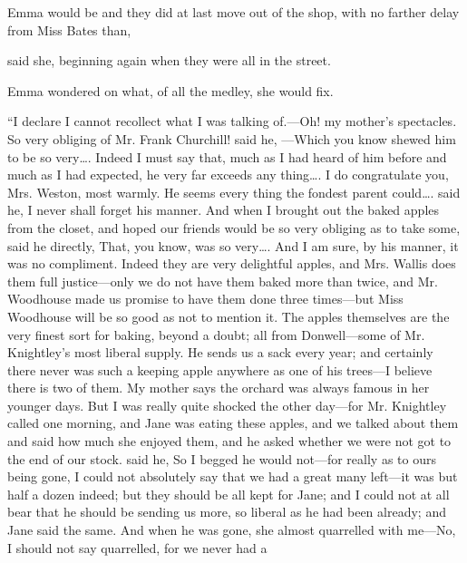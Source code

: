 Emma would be  and they did at last move out of the shop, with no farther delay from Miss Bates than,


 said she, beginning again when they were all in the street.

Emma wondered on what, of all the medley, she would fix.

“I declare I cannot recollect what I was talking of.---Oh! my mother's spectacles. So very obliging of Mr. Frank Churchill!  said he, ---Which you know shewed him to be so very\ldots{}. Indeed I must say that, much as I had heard of him before and much as I had expected, he very far exceeds any thing\ldots{}. I do congratulate you, Mrs. Weston, most warmly. He seems every thing the fondest parent could\ldots{}.  said he,  I never shall forget his manner. And when I brought out the baked apples from the closet, and hoped our friends would be so very obliging as to take some,  said he directly,  That, you know, was so very\ldots{}. And I am sure, by his manner, it was no compliment. Indeed they are very delightful apples, and Mrs. Wallis does them full justice---only we do not have them baked more than twice, and Mr. Woodhouse made us promise to have them done three times---but Miss Woodhouse will be so good as not to mention it. The apples themselves are the very finest sort for baking, beyond a doubt; all from Donwell---some of Mr. Knightley's most liberal supply. He sends us a sack every year; and certainly there never was such a keeping apple anywhere as one of his trees---I believe there is two of them. My mother says the orchard was always famous in her younger days. But I was really quite shocked the other day---for Mr. Knightley called one morning, and Jane was eating these apples, and we talked about them and said how much she enjoyed them, and he asked whether we were not got to the end of our stock.  said he,  So I begged he would not---for really as to ours being gone, I could not absolutely say that we had a great many left---it was but half a dozen indeed; but they should be all kept for Jane; and I could not at all bear that he should be sending us more, so liberal as he had been already; and Jane said the same. And when he was gone, she almost quarrelled with me---No, I should not say quarrelled, for we never had a 